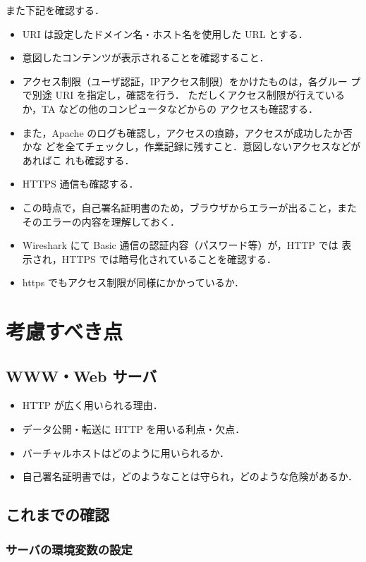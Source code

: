 また下記を確認する．
\begin{itemize}
 \item URI は設定したドメイン名・ホスト名を使用した URL とする．
 \item 意図したコンテンツが表示されることを確認すること．
 \item アクセス制限（ユーザ認証，IPアクセス制限）をかけたものは，各グルー
       プで別途 URI を指定し，確認を行う．
 ただしくアクセス制限が行えているか，TA などの他のコンピュータなどからの
 アクセスも確認する．
 \item  また，Apache のログも確認し，アクセスの痕跡，アクセスが成功したか否かな
 どを全てチェックし，作業記録に残すこと．意図しないアクセスなどがあればこ
 れも確認する．
 \item HTTPS 通信も確認する．
 \item この時点で，自己署名証明書のため，ブラウザからエラーが出ること，またそのエラーの内容を理解しておく．
  \item Wireshark にて Basic 通信の認証内容（パスワード等）が，HTTP では
       表示され，HTTPS では暗号化されていることを確認する．
\item https でもアクセス制限が同様にかかっているか．
\end{itemize}

\section{考慮すべき点}

\subsection*{WWW・Web サーバ}

\begin{itemize}
 \item HTTP が広く用いられる理由．
 \item データ公開・転送に HTTP を用いる利点・欠点．
 \item バーチャルホストはどのように用いられるか．
 \item 自己署名証明書では，どのようなことは守られ，どのような危険があるか．
\end{itemize}

\clearpage

\subsection*{これまでの確認}

\subsubsection*{サーバの環境変数の設定}

